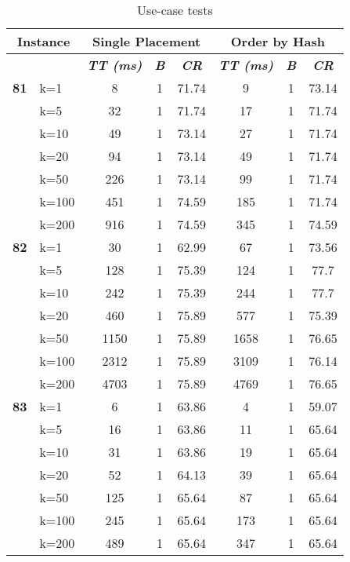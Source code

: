     \begin{table}[htbp]
    \caption{Use-case tests}
    \centering
    \begin{tabular}{|l|l|c|c|c|c|c|c|}
    
    \multicolumn{ 2}{|c|}{\textbf{Instance}} & \multicolumn{ 3}{c|}{\textbf{Single Placement}} & \multicolumn{ 3}{c|}{\textbf{Order by Hash}} \\ \hline
    \multicolumn{ 2}{|l|}{} & \textbf{\textit{TT (ms)}} & \textbf{\textit{B}} & \textbf{\textit{CR}} & \textbf{\textit{TT (ms)}} & \textbf{\textit{B}} & \textbf{\textit{CR}} \\ \hline
    \multicolumn{1}{|r|}{\textbf{81}} & k=1 & 8 & 1 & 71.74 & 9 & 1 & 73.14 \\ 
     & k=5 & 32 & 1 & 71.74 & 17 & 1 & 71.74 \\ 
     & k=10 & 49 & 1 & 73.14 & 27 & 1 & 71.74 \\ 
     & k=20 & 94 & 1 & 73.14 & 49 & 1 & 71.74 \\ 
     & k=50 & 226 & 1 & 73.14 & 99 & 1 & 71.74 \\ 
     & k=100 & 451 & 1 & 74.59 & 185 & 1 & 71.74 \\ 
     & k=200 & 916 & 1 & 74.59 & 345 & 1 & 74.59 \\ \hline
    \multicolumn{1}{|r|}{\textbf{82}} & k=1 & 30 & 1 & 62.99 & 67 & 1 & 73.56 \\ 
     & k=5 & 128 & 1 & 75.39 & 124 & 1 & 77.7 \\ 
     & k=10 & 242 & 1 & 75.39 & 244 & 1 & 77.7 \\ 
     & k=20 & 460 & 1 & 75.89 & 577 & 1 & 75.39 \\ 
     & k=50 & 1150 & 1 & 75.89 & 1658 & 1 & 76.65 \\ 
     & k=100 & 2312 & 1 & 75.89 & 3109 & 1 & 76.14 \\ 
     & k=200 & 4703 & 1 & 75.89 & 4769 & 1 & 76.65 \\ \hline
    \multicolumn{1}{|r|}{\textbf{83}} & k=1 & 6 & 1 & 63.86 & 4 & 1 & 59.07 \\ 
     & k=5 & 16 & 1 & 63.86 & 11 & 1 & 65.64 \\ 
     & k=10 & 31 & 1 & 63.86 & 19 & 1 & 65.64 \\ 
     & k=20 & 52 & 1 & 64.13 & 39 & 1 & 65.64 \\ 
     & k=50 & 125 & 1 & 65.64 & 87 & 1 & 65.64 \\ 
     & k=100 & 245 & 1 & 65.64 & 173 & 1 & 65.64 \\ 
     & k=200 & 489 & 1 & 65.64 & 347 & 1 & 65.64 \\ \hline

\end{tabular}
\end{table}
